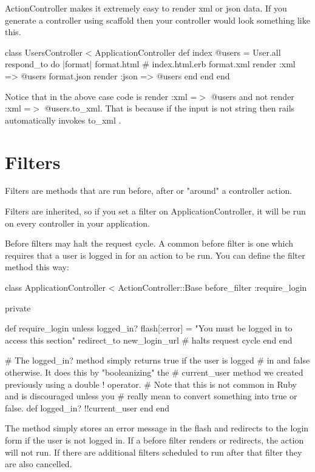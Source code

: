 \documentclass[10pt]{book}
\newenvironment{code}{%
  \scriptsize
    \verbatim
}{%
    \endverbatim
    \newline
}
\begin{document}
ActionController makes it extremely easy to render xml or json data. If you generate a controller using scaffold then your controller would look something like this.
\begin{code}
class UsersController < ApplicationController
  def index
    @users = User.all
    respond_to do |format|
      format.html # index.html.erb
      format.xml  { render :xml => @users}
      format.json { render :json => @users}
    end
  end
end
\end{code}

Notice that in the above case code is render :xml =$>$ @users and not render :xml =$>$ @users.to\_xml. That is because if the input is not string then rails automatically invokes to\_xml .

\section{ Filters}

Filters are methods that are run before, after or "around" a controller action.

Filters are inherited, so if you set a filter on ApplicationController, it will be run on every controller in your application.

Before filters may halt the request cycle. A common before filter is  one which requires that a user is logged in for an action to be run. You  can define the filter method this way:
\begin{code}
class ApplicationController < ActionController::Base
  before_filter :require_login
 
  private
 
  def require_login
    unless logged_in?
      flash[:error] = "You must be logged in to access this section"
      redirect_to new_login_url # halts request cycle
    end
  end
 
  # The logged_in? method simply returns true if the user is logged
  # in and false otherwise. It does this by "booleanizing" the
  # current_user method we created previously using a double ! operator.
  # Note that this is not common in Ruby and is discouraged unless you
  # really mean to convert something into true or false.
  def logged_in?
    !!current_user
  end
end
\end{code}

The method simply stores an error message in the flash and redirects  to the login form if the user is not logged in. If a before filter  renders or redirects, the action will not run. If there are additional  filters scheduled to run after that filter they are also cancelled.
\end{document}
